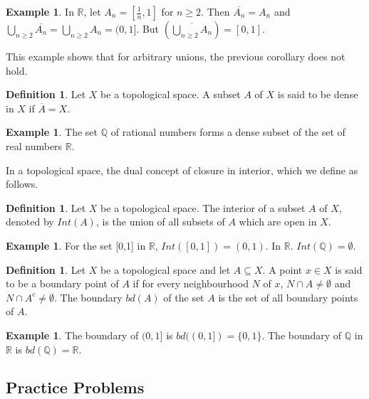 \documentclass[11pt,a4paper]{article}
\theoremstyle{definition}
\newtheorem{defn}[thm]{Definition}
\newtheorem{exa}[thm]{Example}
\begin{document}
\begin{exa}
In $\mathbb{R}$, let $A_n=[\frac{1}{n},1]$ for $n\geq 2$. Then $\overline{A_n}=A_n$ and $\bigcup\limits_{n\geq 2}\overline{A_n}=\bigcup\limits_{n\geq 2}A_n=(0,1]$. But $\left(\overline{\bigcup\limits_{n\geq 2}A_n}\right)=[0,1]$.



This example shows that for arbitrary unions, the previous corollary does not hold.
\end{exa}



\begin{defn}
Let $X$ be a topological space. A subset $A$ of $X$ is said to be dense in $X$ if $\overline{A}=X$.
\end{defn}

\begin{exa}
The set $\mathbb{Q}$ of rational numbers forms a dense subset of the set of real numbers $\mathbb{R}$.
\end{exa}

In a topological space, the dual concept of closure in interior, which we define as follows.

\begin{defn}
Let $X$ be a topological space. The interior of a subset $A$ of $X$, denoted by $Int(A)$, is the union of all subsets of $A$ which are open in $X$.
\end{defn}

\begin{exa}
For the set [0,1] in $\mathbb{R}$, $Int([0,1])=(0,1)$. In $\mathbb{R}$. $Int(\mathbb{Q})=\emptyset$.
\end{exa}

\begin{defn}
Let $X$ be a topological space and let $A\subseteq X$. A point $x\in X$ is said to be a boundary point of $A$ if for every neighbourhood $N$ of $x$, $N\cap A\neq \emptyset$ and $N\cap A^c\neq \emptyset$. The boundary $bd(A)$ of the set $A$ is the set of all boundary points of $A$.
\end{defn}


\begin{exa}
The boundary of $(0,1]$ is $bd((0,1])=\{0,1\}$.
The boundary of $\mathbb{Q}$ in $\mathbb{R}$ is $bd(\mathbb{Q})=\mathbb{R}$.
\end{exa}





\subsection{Practice Problems}
\end{document}
